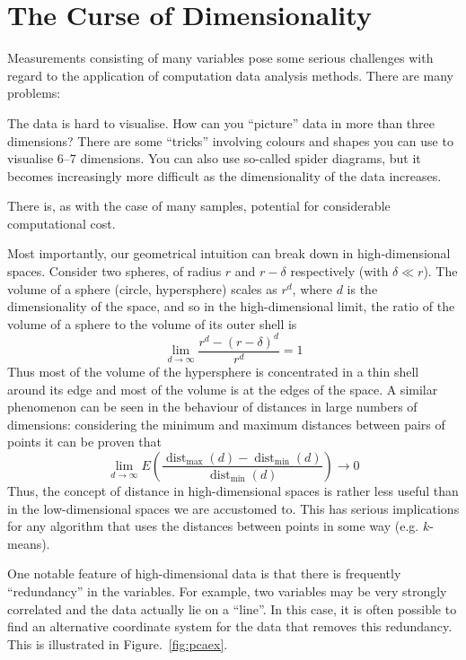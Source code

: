 \documentclass[12pt,a4paper]{tufte-handout}
\begin{document}
\section{The Curse of Dimensionality}
Measurements consisting of many variables pose some serious challenges with regard to the application of computation data analysis methods. There are many problems:
\begin{asparaitem}
  \item The data is hard to visualise. How can you ``picture'' data in more than three dimensions? There are some ``tricks'' involving colours and shapes you can use to visualise 6--7 dimensions. You can also use so-called spider diagrams, but it becomes increasingly more difficult as the dimensionality of the data increases.
    
  \item There is, as with the case of many samples, potential for considerable computational cost.

  \item Most importantly, our geometrical intuition can break down in high-dimensional spaces. Consider two spheres, of radius $r$ and $r-\delta$ respectively (with $\delta \ll r$). The volume of a sphere (circle, hypersphere) scales as $r^d$, where $d$ is the dimensionality of the space, and so in the high-dimensional limit, the ratio of the volume of a sphere to the volume of its outer shell is 
    \begin{equation}
      \lim_{d\rightarrow \infty}\frac{r^d-(r-\delta)^d}{r^d}=1
    \end{equation}
Thus most of the volume of the hypersphere is concentrated in a thin shell around its edge and most of the volume is at the edges of the space. A similar phenomenon can be seen in the behaviour of distances in large numbers of dimensions: considering the minimum and maximum distances between pairs of points it can be proven that
\begin{equation}
  \lim_{d \to \infty} E\left(\frac{\operatorname{dist}_{\max} (d) - \operatorname{dist}_{\min} (d)}{\operatorname{dist}_{\min} (d)}\right) 
\to 0\end{equation}
Thus, the concept of distance in high-dimensional spaces is rather less useful than in the low-dimensional spaces we are accustomed to. This has serious implications for any algorithm that uses the distances between points in some way (e.g. $k$-means).
\end{asparaitem}

One notable feature of high-dimensional data is that  there is frequently ``redundancy'' in the variables. For example, two variables may be very strongly correlated and the data actually lie on a ``line''. In this case, it is often possible to find an alternative coordinate system for the data that removes this redundancy. This is illustrated in Figure.~\ref{fig:pcaex}.
\end{document}
